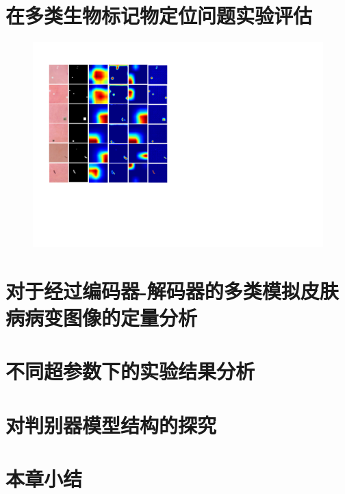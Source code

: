 \section{在多类生物标记物定位问题实验评估}
\begin{figure}[h]
	\centering
	\includegraphics[width=1.0\textwidth]{figure/multi_simulated_skin_res.pdf}
	\caption{}
	\label{fig:multi_simulated_skin_res}
\end{figure}
\section{对于经过编码器-解码器的多类模拟皮肤病病变图像的定量分析}
\section{不同超参数下的实验结果分析}
\section{对判别器模型结构的探究}
\section{本章小结}
